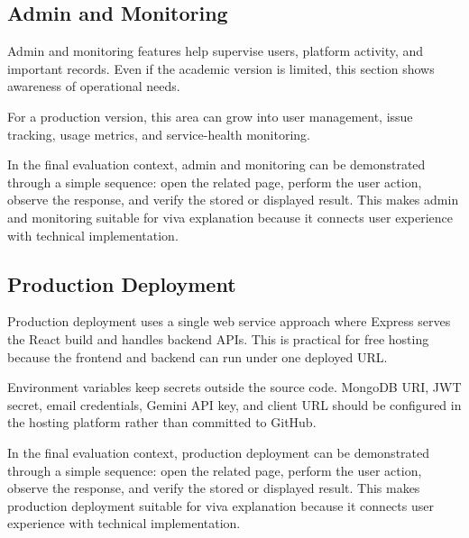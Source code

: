 \documentclass[12pt,a4paper]{report}
\begin{document}
\subsection{Admin and Monitoring}

Admin and monitoring features help supervise users, platform activity, and important records. Even if the academic version is limited, this section shows awareness of operational needs.

For a production version, this area can grow into user management, issue tracking, usage metrics, and service-health monitoring.

In the final evaluation context, admin and monitoring can be demonstrated through a simple sequence: open the related page, perform the user action, observe the response, and verify the stored or displayed result. This makes admin and monitoring suitable for viva explanation because it connects user experience with technical implementation.

\subsection{Production Deployment}

Production deployment uses a single web service approach where Express serves the React build and handles backend APIs. This is practical for free hosting because the frontend and backend can run under one deployed URL.

Environment variables keep secrets outside the source code. MongoDB URI, JWT secret, email credentials, Gemini API key, and client URL should be configured in the hosting platform rather than committed to GitHub.

In the final evaluation context, production deployment can be demonstrated through a simple sequence: open the related page, perform the user action, observe the response, and verify the stored or displayed result. This makes production deployment suitable for viva explanation because it connects user experience with technical implementation.
\end{document}
